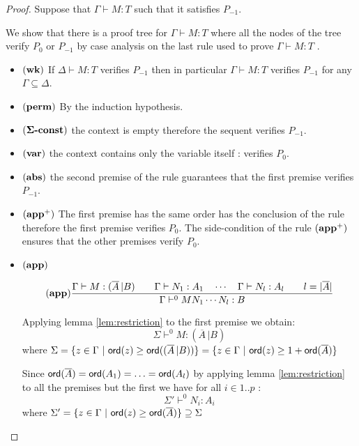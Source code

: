 \begin{proof}
Suppose that $\Gamma \vdash M : T$ such that it satisfies $P_{-1}$.

We show that there is a proof tree for
$\Gamma \vdash M : T$ where all the nodes of the tree verify $P_0$
or $P_{-1}$ by case analysis on the last rule used to prove $\Gamma \vdash M : T$ .

\begin{itemize}
\item $\mathbf{(wk)}$ If $\Delta \vdash M : T$ verifies $P_{-1}$ then in particular $\Gamma
\vdash M : T$ verifies $P_{-1}$ for any $\Gamma \subseteq \Delta$.

\item $\mathbf{(perm)}$ By the induction hypothesis.

\item $\mathbf{(\Sigma\mbox{\textbf{-const}})}$ the context is empty therefore the sequent verifies $P_{-1}$.

\item $\mathbf{(var)}$ the context contains only the variable itself : verifies $P_0$.

\item $\mathbf{(abs)}$ the second premise of the rule guarantees that the first
premise verifies $P_{-1}$.

\item $\mathbf{(app^+)}$ The first premise has the same order has the
conclusion of the rule therefore the first premise verifies
$P_0$. The side-condition of the rule $\mathbf{(app^+)}$ ensures that the other premises verify $P_0$.

\item $\mathbf{(app)}$

$$ \mathbf{(app)}
    \frac{\displaystyle 
        { \Gamma \vdash M : (\overline{A} \, | B)
        \qquad
        \Gamma \vdash N_1 : A_1 \quad \cdots \quad \Gamma \vdash N_{l} : A_l \qquad l = |\overline{A}|
        }
    }{
        \Gamma \vdash^0 M N_1 \cdots N_{l} : B
    }
$$

Applying lemma \ref{lem:restriction} to the first premise we obtain:
\begin{equation}
 \Sigma \vdash^0 M : (\overline{A} \, | B) \label{eq:seq1}
\end{equation}
where $\Sigma = \{ z \in \Gamma \ | \ {\sf ord}(z) \geq {\sf ord}((\overline{A} \, | B)) \} = \{ z \in \Gamma \ | \ {\sf ord}(z) \geq 1 + {\sf ord}(\overline{A}) \} $

Since ${\sf ord}(\overline{A}) = {\sf ord}(A_1) = \ldots = {\sf ord}(A_l)$ by applying lemma \ref{lem:restriction} to all the premises but the first we have
for all $i \in 1..p$ :
$$ \Sigma' \vdash^0 N_i : A_i $$
where
$\Sigma' = \{ z \in \Gamma \ | \ {\sf ord}(z) \geq {\sf ord}(\overline{A}) \} \supseteq \Sigma$


\end{itemize}
\end{proof}
